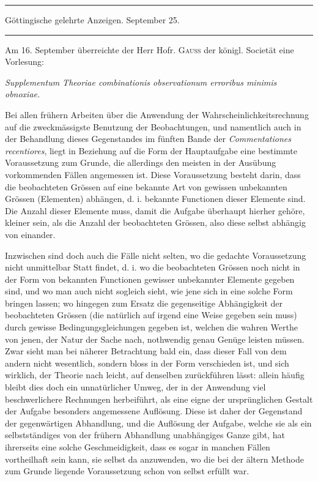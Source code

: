 \par\bigskip
\begin{center}
\rule{.88\textwidth}{.3pt}\par
Göttingische gelehrte Anzeigen. September 25.\par
\rule{.88\textwidth}{.3pt}
\end{center}

Am 16. September überreichte der Herr Hofr. \textsc{Gauss} der königl. Societät eine Vorlesung:
\begin{center}
\textit{Supplementum Theoriae combinationis observationum erroribus minimis obnoxiae.}
\end{center}
\noindent Bei allen frühern Arbeiten über die Anwendung der Wahrscheinlichkeitsrechnung auf die zweckmässigste Benutzung der Beobachtungen, und namentlich auch in der Behandlung dieses Gegenstandes im fünften Bande der \textit{Commentationes recentiores}, liegt in Beziehung auf die Form der Hauptaufgabe eine bestimmte Voraussetzung zum Grunde, die allerdings den meisten in der Ausübung vorkommenden Fällen angemessen ist. Diese Voraussetzung besteht darin, dass die beobachteten Grössen auf eine bekannte Art von gewissen unbekannten Grössen (Elementen) abhängen, d. i. bekannte Functionen dieser Elemente sind. Die Anzahl dieser Elemente muss, damit die Aufgabe überhaupt hierher gehöre, kleiner sein, als die Anzahl der beobachteten Grössen, also diese selbst abhängig von einander.

Inzwischen sind doch auch die Fälle nicht selten, wo die gedachte Voraussetzung nicht unmittelbar Statt findet, d. i. wo die beobachteten Grössen noch nicht in der Form von bekannten Functionen gewisser unbekannter Elemente gegeben sind, und wo man auch nicht sogleich sieht, wie jene sich in eine solche Form bringen lassen; wo hingegen zum Ersatz die gegenseitige Abhängigkeit der beobachteten Grössen (die natürlich auf irgend eine Weise gegeben sein muss) durch gewisse Bedingungsgleichungen gegeben ist, welchen die wahren Werthe von jenen, der Natur der Sache nach, nothwendig genau Genüge leisten müssen. Zwar sieht man bei näherer Betrachtung bald ein, dass dieser Fall von dem andern nicht wesentlich, sondern bloss in der Form verschieden ist, und sich wirklich, der Theorie nach leicht, auf denselben zurückführen lässt: allein häufig bleibt dies doch ein unnatürlicher Umweg, der in der Anwendung viel beschwerlichere Rechnungen herbeiführt, als eine eigne der ursprünglichen Gestalt der Aufgabe besonders angemessene Auflösung. Diese ist daher der Gegenstand der gegenwärtigen Abhandlung, und die Auflösung der Aufgabe, welche sie als ein selbstständiges von der frühern Abhandlung unabhängiges Ganze gibt, hat ihrerseits eine solche Geschmeidigkeit, dass es sogar in manchen Fällen vortheilhaft sein kann, sie selbst da anzuwenden, wo die bei der ältern Methode zum Grunde liegende Voraussetzung schon von selbst erfüllt war.

